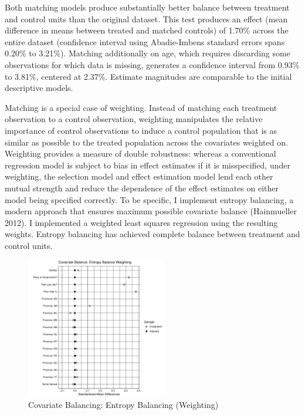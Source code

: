 \documentclass[letter,12pt]{article}
\begin{document}
Both matching models produce substantially better balance between treatment and control units than the original dataset. This test produces an effect (mean difference in means between treated and matched controls) of 1.70\% across the entire dataset (confidence interval using Abadie-Imbens standard errors spans 0.20\% to 3.21\%). Matching additionally on age, which requires discarding some observations for which data is missing, generates a confidence interval from 0.93\% to 3.81\%, centered at 2.37\%. Estimate magnitudes are comparable to the initial descriptive models.

Matching is a special case of weighting. Instead of matching each treatment observation to a control observation, weighting manipulates the relative importance of control observations to induce a control population that is as similar as possible to the treated population across the covariates weighted on. Weighting provides a measure of double robustness: whereas a conventional regression model is subject to bias in effect estimates if it is misspecified, under weighting, the selection model and effect estimation model lend each other mutual strength and reduce the dependence of the effect estimates on either model being specified correctly. To be specific, I implement entropy balancing, a modern approach that ensures maximum possible covariate balance (Hainmueller 2012). I implemented a weighted least squares regression using the resulting weights. Entropy balancing has achieved complete balance between treatment and control units.

\begin{figure}
\centering
\caption{Covariate Balancing: Entropy Balancing (Weighting)}
\includegraphics[width=0.55\textwidth]{"Includes/love_plot_weight"}
\end{figure}
\end{document}
